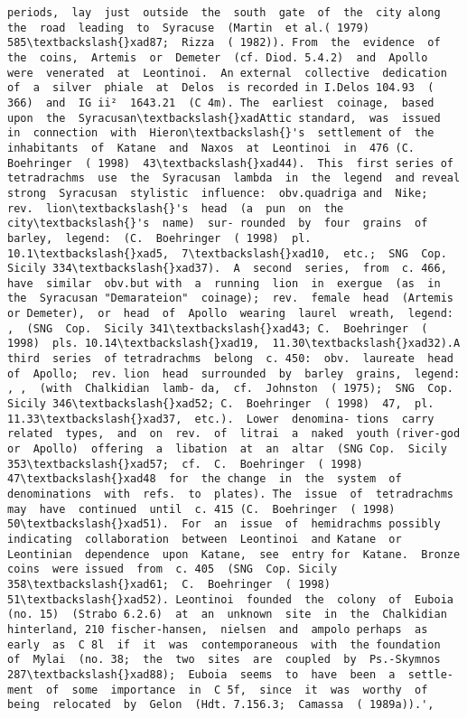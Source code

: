 \documentclass[11pt]{article}
\begin{document}
\begin{Verbatim}[commandchars=\\\{\}]
periods,  lay  just  outside  the  south  gate  of  the  city along  the  road  leading  to  Syracuse  (Martin  et al.( 1979) 585\textbackslash{}xad87;  Rizza  ( 1982)). From  the  evidence  of  the  coins,  Artemis  or  Demeter  (cf. Diod. 5.4.2)  and  Apollo  were  venerated  at  Leontinoi.  An external  collective  dedication  of  a  silver  phiale  at  Delos  is recorded in I.Delos 104.93  ( 366)  and  IG ii²  1643.21  (C 4m). The  earliest  coinage,  based  upon  the  Syracusan\textbackslash{}xadAttic standard,  was  issued  in  connection  with  Hieron\textbackslash{}'s  settlement of  the  inhabitants  of  Katane  and  Naxos  at  Leontinoi  in  476 (C.  Boehringer  ( 1998)  43\textbackslash{}xad44).  This  first series of tetradrachms  use  the  Syracusan  lambda  in  the  legend  and reveal  strong  Syracusan  stylistic  influence:  obv.quadriga and  Nike;  rev.  lion\textbackslash{}'s  head  (a  pun  on  the  city\textbackslash{}'s  name)  sur- rounded  by  four  grains  of  barley,  legend:  (C.  Boehringer  ( 1998)  pl. 10.1\textbackslash{}xad5,  7\textbackslash{}xad10,  etc.;  SNG  Cop.  Sicily 334\textbackslash{}xad37).  A  second  series,  from  c. 466,  have  similar  obv.but with  a  running  lion  in  exergue  (as  in  the  Syracusan "Demarateion"  coinage);  rev.  female  head  (Artemis  or Demeter),  or  head  of  Apollo  wearing  laurel  wreath,  legend: ,  (SNG  Cop.  Sicily 341\textbackslash{}xad43; C.  Boehringer  ( 1998)  pls. 10.14\textbackslash{}xad19,  11.30\textbackslash{}xad32).A  third  series  of tetradrachms  belong  c. 450:  obv.  laureate  head  of  Apollo;  rev. lion  head  surrounded  by  barley  grains,  legend: , ,  (with  Chalkidian  lamb- da,  cf.  Johnston  ( 1975);  SNG  Cop.  Sicily 346\textbackslash{}xad52; C.  Boehringer  ( 1998)  47,  pl. 11.33\textbackslash{}xad37,  etc.).  Lower  denomina- tions  carry  related  types,  and  on  rev.  of  litrai  a  naked  youth (river-god  or  Apollo)  offering  a  libation  at  an  altar  (SNG Cop.  Sicily 353\textbackslash{}xad57;  cf.  C.  Boehringer  ( 1998)  47\textbackslash{}xad48  for  the change  in  the  system  of  denominations  with  refs.  to  plates). The  issue  of  tetradrachms  may  have  continued  until  c. 415 (C.  Boehringer  ( 1998)  50\textbackslash{}xad51).  For  an  issue  of  hemidrachms possibly  indicating  collaboration  between  Leontinoi  and Katane  or  Leontinian  dependence  upon  Katane,  see  entry for  Katane.  Bronze  coins  were issued  from  c. 405  (SNG  Cop. Sicily 358\textbackslash{}xad61;  C.  Boehringer  ( 1998)  51\textbackslash{}xad52). Leontinoi  founded  the  colony  of  Euboia  (no. 15)  (Strabo 6.2.6)  at  an  unknown  site  in  the  Chalkidian  hinterland, 210 fischer-hansen,  nielsen  and  ampolo perhaps  as  early  as  C 8l  if  it  was  contemporaneous  with  the foundation  of  Mylai  (no. 38;  the  two  sites  are  coupled  by  Ps.-Skymnos  287\textbackslash{}xad88);  Euboia  seems  to  have  been  a  settle- ment  of  some  importance  in  C 5f,  since  it  was  worthy  of being  relocated  by  Gelon  (Hdt. 7.156.3;  Camassa  ( 1989a)).',

\end{Verbatim}
\end{document}
